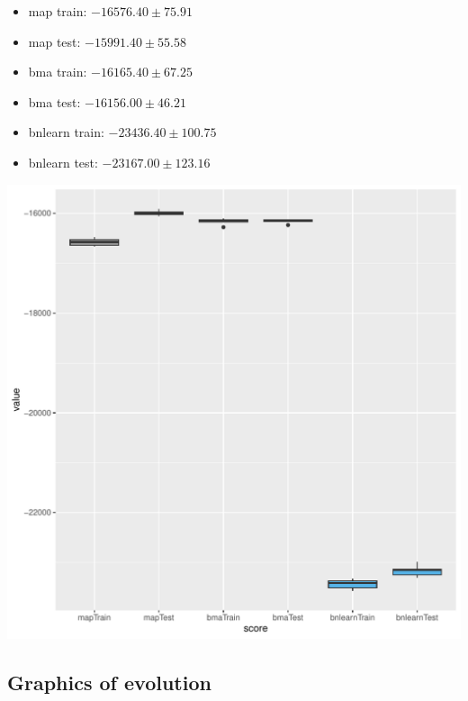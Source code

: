 \documentclass[]{scrartcl}
\begin{document}
\begin{itemize}
\item map train:  $-16576.40  \pm  75.91$
\item map test:  $-15991.40  \pm  55.58$
\item bma train:  $-16165.40  \pm  67.25$
\item bma test:  $-16156.00  \pm  46.21$
\item bnlearn train:  $-23436.40  \pm  100.75$
\item bnlearn test:  $-23167.00  \pm  123.16$
\end{itemize}

\includegraphics[scale = 0.5]{./figs/win95pts/win95pts-boxplots.pdf}

\subsection{Graphics of evolution}
\end{document}
